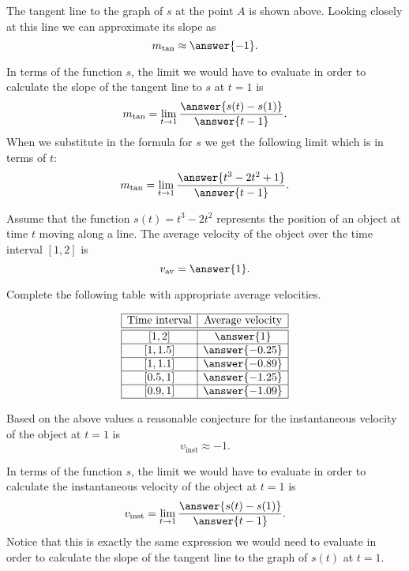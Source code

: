 \documentclass{ximera}
\begin{document}
\begin{exercise}
\begin{exercise}
\begin{exercise}
\begin{image}
\end{image}

The tangent line to the graph of $s$ at the point $A$ is shown above.  Looking closely at this line we can approximate its slope as
\[
m_{\text{tan}}\approx\answer{-1}.
\]

In terms of the function $s$, the limit we would have to evaluate in order to calculate the slope of the tangent line to $s$ at $t=1$ is
\[
m_{\text{tan}} = \lim_{t\to1}\frac{\answer{s(t)-s(1)}}{\answer{t-1}}.
\]
When we substitute in the formula for $s$ we get the following limit which is in terms of $t$:
\[
m_{\text{tan}} = \lim_{t\to1}\frac{\answer{t^3-2t^2+1}}{\answer{t-1}}.
\]

\begin{exercise}

Assume that the function $s(t) = t^3-2t^2$ represents the position of an object at time $t$ moving along a line.  The average velocity of the object over the time interval $[1,2]$ is
\[
v_{\text{av}} = \answer{1}.
\]

Complete the following table with appropriate average velocities.

\[
\begin{array}{|c|c|}
\hline
\text{Time interval} & \text{Average velocity} \\\hline\hline
[1,2] & \answer{1} \\\hline
[1,1.5] & \answer{-0.25} \\\hline
[1,1.1] & \answer{-0.89} \\\hline
[0.5,1] & \answer{-1.25} \\\hline
[0.9,1] & \answer{-1.09} \\\hline
\end{array}
\]

Based on the above values a reasonable conjecture for the instantaneous velocity of the object at $t=1$ is
\[
v_{\text{inst}}\approx{-1}.
\]

In terms of the function $s$, the limit we would have to evaluate in order to calculate the instantaneous velocity of the object at $t=1$ is
\[
v_{\text{inst}} = \lim_{t\to1}\frac{\answer{s(t)-s(1)}}{\answer{t-1}}.
\]
Notice that this is exactly the same expression we would need to evaluate in order to calculate the slope of the tangent line to the graph of $s(t)$ at $t=1$.

\end{exercise}
\end{exercise}
\end{exercise}
\end{exercise}
\end{document}
